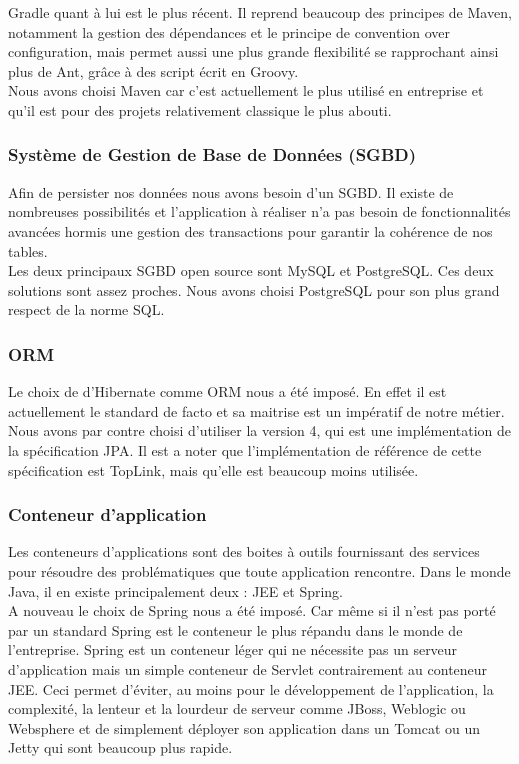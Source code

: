 Gradle quant à lui est le plus récent. Il reprend beaucoup des principes de Maven, notamment la gestion des dépendances et le principe de \flqq{}convention over configuration\frqq{}, mais permet aussi une plus grande flexibilité se rapprochant ainsi plus de Ant, grâce à des script écrit en Groovy.\\

Nous avons choisi Maven car c'est actuellement le plus utilisé en entreprise et qu'il est pour des projets relativement classique le plus abouti.

\subsubsection{Système de Gestion de Base de Données (SGBD)}

Afin de persister nos données nous avons besoin d'un SGBD. Il existe de nombreuses possibilités et l'application à réaliser n'a pas besoin de fonctionnalités avancées hormis une gestion des transactions pour garantir la cohérence de nos tables.\\

Les deux principaux SGBD open source sont MySQL et PostgreSQL. Ces deux solutions sont assez proches. Nous avons choisi PostgreSQL pour son plus grand respect de la norme SQL.

\subsubsection{ORM}

Le choix de d'Hibernate comme ORM nous a été imposé. En effet il est actuellement le standard de facto et sa maitrise est un impératif de notre métier. Nous avons par contre choisi d'utiliser la version 4, qui est une implémentation de la spécification JPA. Il est a noter que l'implémentation de référence de cette spécification est TopLink, mais qu'elle est beaucoup moins utilisée. 

\subsubsection{Conteneur d'application}

Les conteneurs d'applications sont des boites à outils fournissant des services pour résoudre des problématiques que toute application rencontre. Dans le monde Java, il en existe principalement deux : JEE et Spring.\\

A nouveau le choix de Spring nous a été imposé. Car même si il n'est pas porté par un standard Spring est le conteneur le plus répandu dans le monde de l'entreprise. Spring est un conteneur léger qui ne nécessite pas un serveur d'application mais un simple conteneur de Servlet contrairement au conteneur JEE. Ceci permet d'éviter, au moins pour le développement de l'application, la complexité, la lenteur et la lourdeur de serveur comme JBoss, Weblogic ou Websphere et de simplement déployer son application dans un Tomcat ou un Jetty qui sont beaucoup plus rapide.\\

